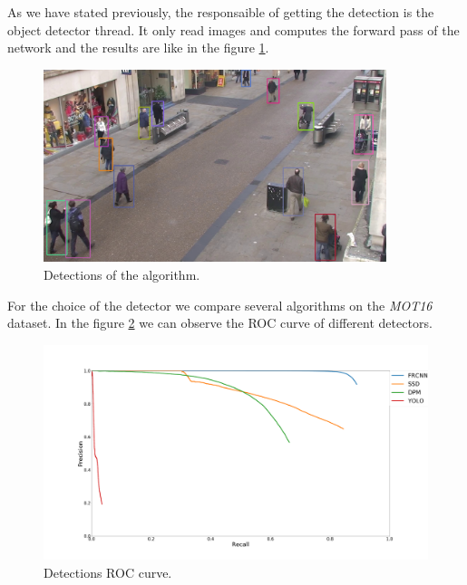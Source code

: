 \documentclass[12pt, a4paper, titlepage,twoside,openright]{article}
\begin{document}
As we have stated previously, the responsaible of getting the detection is the object detector thread. It only read images and computes the forward pass of the network and the results are like in the figure \ref{objectDetector1}.

\begin{figure}[H]
\centering         
\includegraphics[width=10cm]{intro/deteccions.jpg}
\caption{Detections of the algorithm.} \label{objectDetector1}
\end{figure}



%

For the choice of the detector we compare several algorithms on the \textit{MOT16} dataset. In the figure \ref{objectDetector2} we can observe the ROC curve of different detectors.


\begin{figure}[h!]
\centering         
\includegraphics[width=15cm]{objectDetection/det.png}
\caption{Detections ROC curve.} \label{objectDetector2}
\end{figure}
\end{document}
